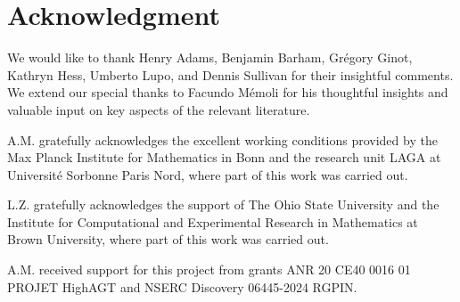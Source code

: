 
\section*{Acknowledgment}

We would like to thank Henry Adams, Benjamin Barham, Gr\'egory Ginot, Kathryn Hess, Umberto Lupo, and Dennis Sullivan for their insightful comments.
We extend our special thanks to Facundo M\'{e}moli for his thoughtful insights and valuable input on key aspects of the relevant literature.

A.M. gratefully acknowledges the excellent working conditions provided by the Max Planck Institute for Mathematics in Bonn and the research unit LAGA at Université Sorbonne Paris Nord, where part of this work was carried out.

L.Z. gratefully acknowledges the support of The Ohio State University and the Institute for Computational and Experimental Research in Mathematics at Brown University, where part of this work was carried out.

A.M. received support for this project from grants ANR 20 CE40 0016 01 PROJET HighAGT and NSERC Discovery 06445-2024 RGPIN.